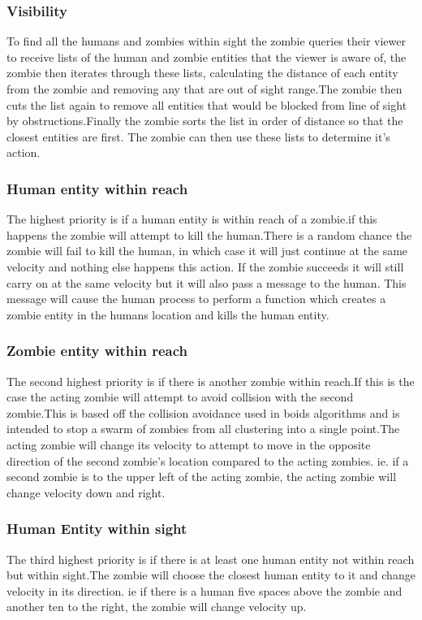 \subsubsection{Visibility}
To find all the humans and zombies within sight the zombie queries their viewer to receive lists of the human and zombie entities that the viewer is aware of, the zombie then iterates through these lists, calculating the distance of each entity from the zombie and removing any that are out of sight range.The zombie then cuts the list again to remove all entities that would be blocked from line of sight by obstructions.Finally the zombie sorts the list in order of distance so that the closest entities are first.
The zombie can then use these lists to determine it's action.
\subsubsection{Human entity within reach}
The highest priority is if a human entity is within reach of a zombie.if this happens the zombie will attempt to kill the human.There is a random chance the zombie will fail to kill the human, in which case it will just continue at the same velocity and nothing else happens this action. If the zombie succeeds it will still carry on at the same velocity but it will also pass a message to the human. This message will cause the human process to perform a function which creates a zombie entity in the humans location and kills the human entity.

\subsubsection{Zombie entity within reach}
The second highest priority is if there is another zombie within reach.If this is the case the acting zombie will attempt to avoid collision with the second zombie.This is based off the collision avoidance used in boids algorithms and is intended to stop a swarm of zombies from all clustering into a single point.The acting zombie will change its velocity to attempt to move in the opposite direction of the second zombie's location compared to the acting zombies. ie. if a second zombie is to the upper left of the acting zombie, the acting zombie will change velocity down and right.

\subsubsection{Human Entity within sight}
The third highest priority is if there is at least one human entity not within reach but within sight.The zombie will choose the closest human entity to it and change velocity in its direction. ie if there is a human five spaces above the zombie and another ten to the right, the zombie will change velocity up.

